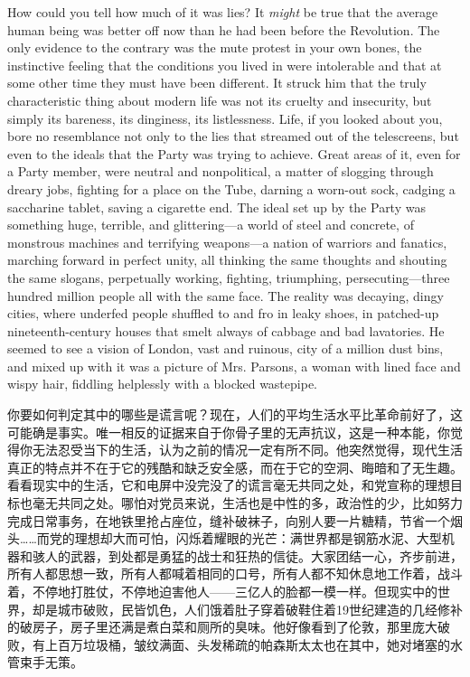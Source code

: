 \begin{paracol}{2}
How could you tell how much of it was lies? It \emph{might} be true that
the average human being was better off now than he had been before the
Revolution. The only evidence to the contrary was the mute protest in
your own bones, the instinctive feeling that the conditions you lived in
were intolerable and that at some other time they must have been
different. It struck him that the truly characteristic thing about
modern life was not its cruelty and insecurity, but simply its bareness,
its dinginess, its listlessness. Life, if you looked about you, bore no
resemblance not only to the lies that streamed out of the telescreens,
but even to the ideals that the Party was trying to achieve. Great areas
of it, even for a Party member, were neutral and nonpolitical, a matter
of slogging through dreary jobs, fighting for a place on the Tube,
darning a worn-out sock, cadging a saccharine tablet, saving a cigarette
end. The ideal set up by the Party was something huge, terrible, and
glittering---a world of steel and concrete, of monstrous machines and
terrifying weapons---a nation of warriors and fanatics, marching forward
in perfect unity, all thinking the same thoughts and shouting the same
slogans, perpetually working, fighting, triumphing, persecuting---three
hundred million people all with the same face. The reality was decaying,
dingy cities, where underfed people shuffled to and fro in leaky shoes,
in patched-up nineteenth-century houses that smelt always of cabbage and
bad lavatories. He seemed to see a vision of London, vast and ruinous,
city of a million dust bins, and mixed up with it was a picture of Mrs.
Parsons, a woman with lined face and wispy hair, fiddling helplessly
with a blocked wastepipe.

\switchcolumn

你要如何判定其中的哪些是谎言呢？现在，人们的平均生活水平比革命前好了，这可能确是事实。唯一相反的证据来自于你骨子里的无声抗议，这是一种本能，你觉得你无法忍受当下的生活，认为之前的情况一定有所不同。他突然觉得，现代生活真正的特点并不在于它的残酷和缺乏安全感，而在于它的空洞、晦暗和了无生趣。看看现实中的生活，它和电屏中没完没了的谎言毫无共同之处，和党宣称的理想目标也毫无共同之处。哪怕对党员来说，生活也是中性的多，政治性的少，比如努力完成日常事务，在地铁里抢占座位，缝补破袜子，向别人要一片糖精，节省一个烟头\ldots\ldots 而党的理想却大而可怕，闪烁着耀眼的光芒：满世界都是钢筋水泥、大型机器和骇人的武器，到处都是勇猛的战士和狂热的信徒。大家团结一心，齐步前进，所有人都思想一致，所有人都喊着相同的口号，所有人都不知休息地工作着，战斗着，不停地打胜仗，不停地迫害他人——三亿人的脸都一模一样。但现实中的世界，却是城市破败，民皆饥色，人们饿着肚子穿着破鞋住着19世纪建造的几经修补的破房子，房子里还满是煮白菜和厕所的臭味。他好像看到了伦敦，那里庞大破败，有上百万垃圾桶，皱纹满面、头发稀疏的帕森斯太太也在其中，她对堵塞的水管束手无策。


\end{paracol}
